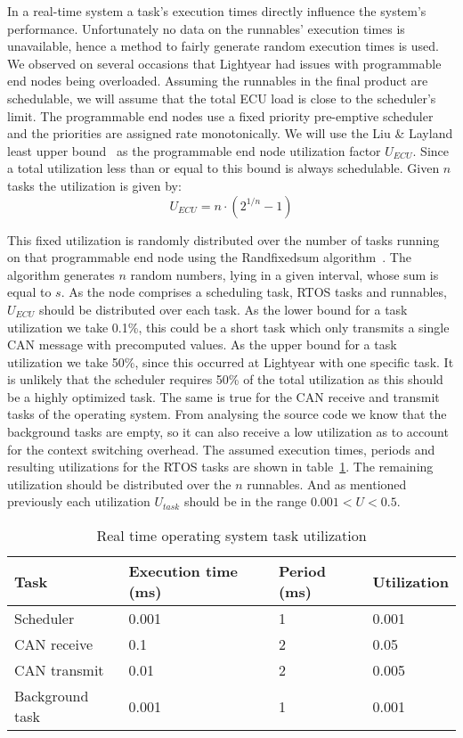 In a real-time system a task's execution times directly influence the system's performance. Unfortunately no data on the runnables' execution times is unavailable, hence a method to fairly generate random execution times is used. We observed on several occasions that Lightyear had issues with programmable end nodes being overloaded. Assuming the runnables in the final product are schedulable, we will assume that the total ECU load is close to the scheduler's limit. The programmable end nodes use a fixed priority pre-emptive scheduler and the priorities are assigned rate monotonically. We will use the Liu \& Layland least upper bound~\cite{liu1973scheduling} as the programmable end node utilization factor $U_{ECU}$. Since a total utilization less than or equal to this bound is always schedulable. Given $n$ tasks the utilization is given by:
\begin{equation}
    U_{ECU} = n \cdot (2^{1/n} -1)
\end{equation}

This fixed utilization is randomly distributed over the number of tasks running on that programmable end node using the Randfixedsum algorithm~\cite{emberson2010techniques}. The algorithm generates $n$ random numbers, lying in a given interval, whose sum is equal to $s$. As the node comprises a scheduling task, RTOS tasks and runnables, $U_{ECU}$ should be distributed over each task. As the lower bound for a task utilization we take 0.1\%, this could be a short task which only transmits a single CAN message with precomputed values. As the upper bound for a task utilization we take 50\%, since this occurred at Lightyear with one specific task. It is unlikely that the scheduler requires 50\% of the total utilization as this should be a highly optimized task. The same is true for the CAN receive and transmit tasks of the operating system. From analysing the source code we know that the background tasks are empty, so it can also receive a low utilization as to account for the context switching overhead. The assumed execution times, periods and resulting utilizations for the RTOS tasks are shown in table~\ref{tab:util}. The remaining utilization should be distributed over the $n$ runnables. And as mentioned previously each utilization $U_{task}$ should be in the range $0.001 < U < 0.5$.

\begin{table}[htb]
    \centering
    \begin{tabular}{@{}llll@{}}
    \toprule
    Task            & Execution time (ms) & Period (ms) & Utilization \\ \midrule
    Scheduler       & 0.001               & 1           & 0.001       \\
    CAN receive     & 0.1                 & 2           & 0.05        \\
    CAN transmit    & 0.01                & 2           & 0.005       \\
    Background task & 0.001               & 1           & 0.001       \\ \bottomrule
    \end{tabular}
    \caption{Real time operating system task utilization}
    \label{tab:util}
\end{table}

